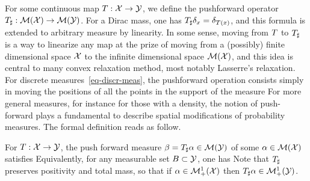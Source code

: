   
For some continuous map $T : \mathcal{X} \rightarrow \mathcal{Y}$, we define the pushforward operator $T_\sharp : \mathcal{M}(\mathcal{X}) \rightarrow \mathcal{M}(\mathcal{Y})$. 
%
For a Dirac mass, one has $T_\sharp \delta_{x} = \delta_{T(x)}$, and this formula is extended to arbitrary measure by linearity. In some sense, moving from $T$ to $T_\sharp$ is a way to linearize any map at the prize of moving from a (possibly) finite dimensional space $\mathcal{X}$ to the infinite dimensional space $\mathcal{M}(\mathcal{X})$, and this idea is central to many convex relaxation method, most notably Lasserre's relaxation.
%
For discrete measures~\eqref{eq-discr-meas}, the pushforward operation consists simply in moving the positions of all the points in the support of the measure
For more general measures, for instance for those with a density, the notion of push-forward plays a fundamental to describe spatial modifications of probability measures. The formal definition reads as follow.

\begin{defn}\label{defn-pushfwd}
For $T : \mathcal{X} \rightarrow \mathcal{Y}$, the push forward measure $\beta = T_\sharp \alpha \in \mathcal{M}(\mathcal{Y})$ of some $\alpha \in \mathcal{M}(\mathcal{X})$ satisfies
Equivalently, for any measurable set $B \subset \mathcal{Y}$, one has
Note that $T_\sharp$ preserves positivity and total mass, so that if $\alpha \in \mathcal{M}_+^1(\mathcal{X})$ then $T_\sharp \alpha \in \mathcal{M}_+^1(\mathcal{Y})$. 
\end{defn}





